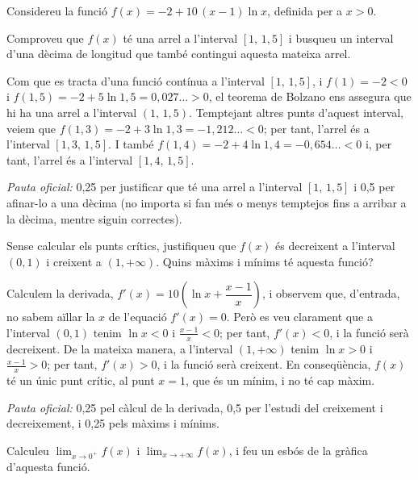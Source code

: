 Considereu la funció $f(x)=-2+10\,(x-1)\ln x$, definida per a $x>0$.

\begin{apartats}

Comproveu que $f(x)$ té una arrel a l'interval $[1,\,1{,}5]$ i busqueu un interval d'una dècima de longitud que
també contingui aquesta mateixa arrel.

\begin{solucio}
Com que es tracta d'una funció contínua a l'interval $[1,\,1{,}5]$, i $f(1)=-2<0$ i
$f(1{,}5)=-2+5\ln1{,}5=0{,}027\ldots>0$, el teorema de Bolzano ens assegura que hi ha una arrel a l'interval
$(1,\,1{,}5)$. Temptejant altres punts d'aquest interval, veiem que $f(1{,}3)=-2+3\ln1{,}3=-1{,}212\ldots<0$;
per tant, l'arrel és a l'interval $[1{,}3,\,1{,}5]$. I també $f(1{,}4)=-2+4\ln1{,}4=-0{,}654\ldots<0$ i, per tant,
l'arrel és a l'interval $[1{,}4,\,1{,}5]$.

\textit{Pauta oficial:} 0,25 per justificar que té una arrel a l'interval $[1,\,1{,}5]$ i 0,5 per afinar-lo a
una dècima (no importa si fan més o menys temptejos fins a arribar a la dècima, mentre siguin correctes).
\end{solucio}

Sense calcular els punts crítics, justifiqueu que $f(x)$ és decreixent a l'interval $(0,1)$ i creixent a
$(1,+\infty)$. Quins màxims i mínims té aquesta funció?

\begin{solucio}
Calculem la derivada, $f'(x)=10\left(\ln x+\dfrac{x-1}{x}\right)$, i observem que, d'entrada, no sabem aïllar la
$x$ de l'equació $f'(x)=0$. Però es veu clarament que a l'interval $(0,1)$ tenim $\ln x<0$ i
$\frac{x-1}{x}<0$; per tant, $f'(x)<0$, i la funció serà decreixent. De la mateixa manera, a l'interval
$(1,+\infty)$ tenim $\ln x>0$ i $\frac{x-1}{x}>0$; per tant, $f'(x)>0$, i la funció serà creixent. En
conseqüència, $f(x)$ té un únic punt crític, al punt $x=1$, que és un mínim, i no té cap màxim.

\textit{Pauta oficial:} 0,25 pel càlcul de la derivada, 0,5 per l'estudi del creixement i decreixement, i 0,25
pels màxims i mínims.
\end{solucio}

Calculeu $\lim_{x\to0^+}f(x)$ i $\lim_{x\to+\infty}f(x)$, i feu un esbós de la gràfica d'aquesta funció.


\end{apartats}

